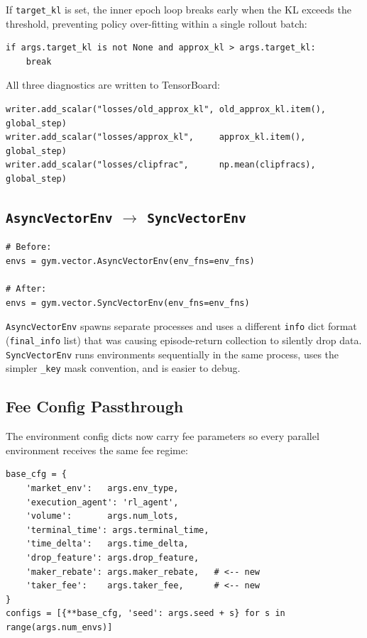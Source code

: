 \documentclass[11pt,a4paper]{article}
\begin{document}
If \texttt{target\_kl} is set, the inner epoch loop breaks early when
the KL exceeds the threshold, preventing policy over-fitting within a
single rollout batch:

\begin{lstlisting}
if args.target_kl is not None and approx_kl > args.target_kl:
    break
\end{lstlisting}

All three diagnostics are written to TensorBoard:

\begin{lstlisting}
writer.add_scalar("losses/old_approx_kl", old_approx_kl.item(), global_step)
writer.add_scalar("losses/approx_kl",     approx_kl.item(),     global_step)
writer.add_scalar("losses/clipfrac",      np.mean(clipfracs),   global_step)
\end{lstlisting}

\subsection{\texttt{AsyncVectorEnv} $\to$ \texttt{SyncVectorEnv}}

\begin{lstlisting}
# Before:
envs = gym.vector.AsyncVectorEnv(env_fns=env_fns)

# After:
envs = gym.vector.SyncVectorEnv(env_fns=env_fns)
\end{lstlisting}

\texttt{AsyncVectorEnv} spawns separate processes and uses a different
\texttt{info} dict format (\texttt{final\_info} list) that was causing
episode-return collection to silently drop data.
\texttt{SyncVectorEnv} runs environments sequentially in the same
process, uses the simpler \texttt{\_key} mask convention, and is easier
to debug.

\subsection{Fee Config Passthrough}

The environment config dicts now carry fee parameters so every parallel
environment receives the same fee regime:

\begin{lstlisting}
base_cfg = {
    'market_env':   args.env_type,
    'execution_agent': 'rl_agent',
    'volume':       args.num_lots,
    'terminal_time': args.terminal_time,
    'time_delta':   args.time_delta,
    'drop_feature': args.drop_feature,
    'maker_rebate': args.maker_rebate,   # <-- new
    'taker_fee':    args.taker_fee,      # <-- new
}
configs = [{**base_cfg, 'seed': args.seed + s} for s in range(args.num_envs)]
\end{lstlisting}
\end{document}
